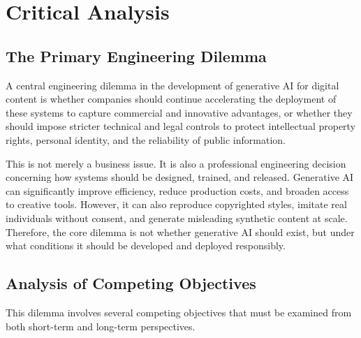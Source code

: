 \section{Critical Analysis}\label{sec:critical-analysis}

\subsection{The Primary Engineering Dilemma}\label{sec:dilemma}
A central engineering dilemma in the development of generative AI for digital content is whether companies should continue accelerating the deployment of these systems to capture commercial and innovative advantages, or whether they should impose stricter technical and legal controls to protect intellectual property rights, personal identity, and the reliability of public information.

This is not merely a business issue. It is also a professional engineering decision concerning how systems should be designed, trained, and released. Generative AI can significantly improve efficiency, reduce production costs, and broaden access to creative tools. However, it can also reproduce copyrighted styles, imitate real individuals without consent, and generate misleading synthetic content at scale. Therefore, the core dilemma is not whether generative AI should exist, but under what conditions it should be developed and deployed responsibly.

\subsection{Analysis of Competing Objectives}\label{sec:competing-objectives}
This dilemma involves several competing objectives that must be examined from both short-term and long-term perspectives.

